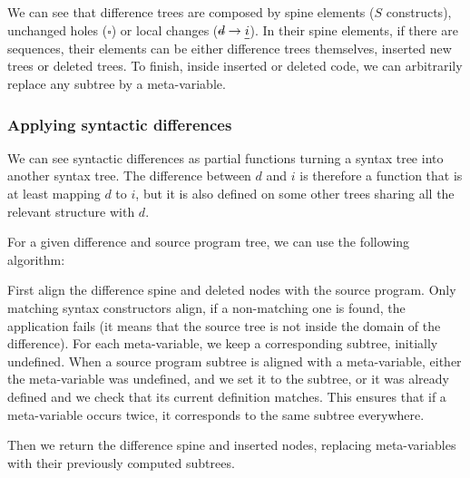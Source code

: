 \documentclass[a4paper,11pt]{article}
\newcommand\mathst[1]{\text{\st{$#1$}}}
\newcommand\mathul[1]{\text{\ul{$#1$}}}
\newcommand\change[2]{\mathst{#1} \rightarrow \mathul{#2}}
\newcommand\gb[1]{}%
\begin{document}
We can see that difference trees are composed by spine elements ($S$ constructs), unchanged holes ($\square$) or local changes ($\change{d}{i}$). In their spine elements, if there are sequences, their elements can be either difference trees themselves, inserted new trees or deleted trees. To finish, inside inserted or deleted code, we can arbitrarily replace any subtree by a meta-variable.

\gb{Notations about deletion, insertion and $\square$ are now introduced in the overview}

\subsubsection{Applying syntactic differences}
\label{sec:diff_application}

We can see syntactic differences as partial functions turning a syntax
tree into another syntax tree.  The difference between $d$ and $i$ is
therefore a function that is at least mapping $d$ to $i$, but it is
also defined on some other trees sharing all the relevant structure
with $d$.

For a given difference and source program tree, we can use the following algorithm:

First align the difference spine and deleted nodes with the source program. Only matching syntax constructors align, if a non-matching one is found, the application fails (it means that the source tree is not inside the domain of the difference). For each meta-variable, we keep a corresponding subtree, initially undefined. When a source program subtree is aligned with a meta-variable, either the meta-variable was undefined, and we set it to the subtree, or it was already defined and we check that its current definition matches. This ensures that if a meta-variable occurs twice, it corresponds to the same subtree everywhere.

Then we return the difference spine and inserted nodes, replacing meta-variables with their previously computed subtrees.
\end{document}

